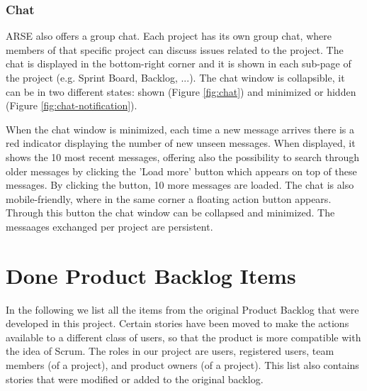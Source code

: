 \documentclass[
	accentcolor=tud1a %
]{tudreport}
\begin{document}
\subsection{Chat}
\label{sec:chat}
ARSE also offers a group chat. Each project has its own group chat, where members of that specific project can discuss issues related to the project. The chat is displayed in the bottom-right corner and it is shown in each sub-page of the project (e.g. Sprint Board, Backlog, ...). The chat window is collapsible, it can be in two different states: shown (Figure \ref{fig:chat}) and minimized or hidden (Figure \ref{fig:chat-notification}). 

When the chat window is minimized, each time a new message arrives there is a red indicator displaying the number of new unseen messages. When displayed, it shows the 10 most recent messages, offering also the possibility to search through older messages by clicking the 'Load more' button which appears on top of these messages. By clicking the button, 10 more messages are loaded. The chat is also mobile-friendly, where in the same corner a floating action button appears. Through this button the chat window can be collapsed and minimized. The messaages exchanged per project are persistent. 


\chapter{Done Product Backlog Items}
\label{ch:done-pbis}

In the following we list all the items from the original Product Backlog that were developed in this project. Certain stories have been moved to make the actions available to a different class of users, so that the product is more compatible with the idea of Scrum. The roles in our project are users, registered users, team members (of a project), and product owners (of a project). This list also contains stories that were modified or added to the original backlog.

\end{document}

